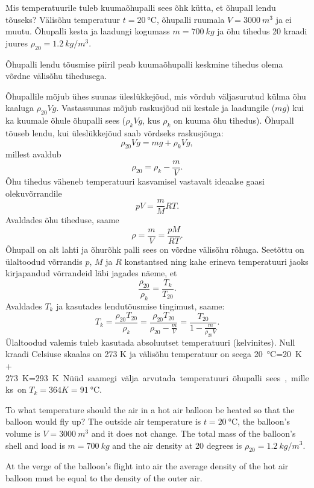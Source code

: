 
Mis temperatuurile tuleb kuumaõhupalli sees õhk kütta, et õhupall lendu tõuseks?
Välisõhu temperatuur $t=\SI{20}{\degreeCelsius}$, õhupalli ruumala $V=\SI{3000}{m^3}$ ja ei
muutu. Õhupalli kesta ja laadungi kogumass $m=\SI{700}{kg}$ ja õhu tihedus
20 kraadi juures $\rho_{20}=\SI{1,2}{kg/m^3}$.

\hint
Õhupalli lendu tõusmise piiril peab kuumaõhupalli keskmine tihedus olema võrdne välisõhu tihedusega.

\solu
Õhupallile mõjub ühes suunas üleslükkejõud, mis võrdub väljasurutud külma õhu 
kaaluga $\rho_{20} V g$. Vastassuunas mõjub raskusjõud nii kestale ja laadungile ($mg$) kui ka kuumale õhule õhupalli sees ($\rho_k V g$, kus $\rho_k$ on kuuma õhu tihedus). Õhupall tõuseb lendu, kui üleslükkejõud saab võrdseks raskusjõuga:
\[ \rho_{20} V g=mg+\rho_k V g,\]
millest avaldub
\[ \rho_{20}=\rho_k-\frac{m}{V}.\]
Õhu tihedus väheneb temperatuuri kasvamisel vastavalt ideaalse gaasi olekuvõrrandile
\[ pV=\frac{m}{M}RT. \]
Avaldades õhu tiheduse, saame
\[ \rho=\frac{m}{V}=\frac{pM}{RT}.\]
Õhupall on alt lahti ja õhurõhk palli sees on võrdne välisõhu rõhuga. Seetõttu on ülaltoodud võrrandis $p$, $M$ ja $R$ konstantsed ning kahe erineva temperatuuri jaoks kirjapandud võrrandeid läbi jagades näeme, et
\[ \frac{\rho_{20}}{\rho_k}=\frac{T_k}{T_{20}}.\]
Avaldades $T_k$ ja kasutades lendutõusmise tingimust, saame:
\[ T_k=\frac{\rho_{20} T_{20}}{\rho_k}=\frac{\rho_{20} 
T_{20}}{\rho_{20}-\frac{m}{V}}=\frac{T_{20}}{1-\frac{m}{\rho_{20}V}}.\]
Ülaltoodud valemis tuleb kasutada absoluutset temperatuuri (kelvinites). Null 
kraadi Celsiuse skaalas on 273 K ja välisõhu temperatuur on seega 
\SI{20}{\degreeCelsius}=\SI{20}{K} + \SI{273}{K}=\SI{293}K. Nüüd saamegi välja arvutada temperatuuri õhupalli sees, milleks on $T_k=\SI{364}K=\SI{91}\degreeCelsius$.

To what temperature should the air in a hot air balloon be heated so that the balloon would fly up? The outside air temperature is $t=\SI{20}{\degreeCelsius}$, the balloon's volume is $V=\SI{3000}{m^3}$ and it does not change. The total mass of the balloon's shell and load is $m=\SI{700}{kg}$ and the air density at 20 degrees is $\rho_{20}=\SI{1,2}{kg/m^3}$.

\hinteng
At the verge of the balloon's flight into air the average density of the hot air balloon must be equal to the density of the outer air.

